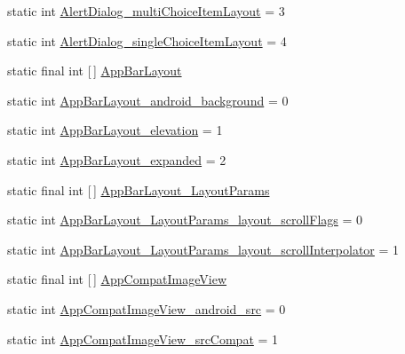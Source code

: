 \begin{DoxyCompactItemize}
\item 
static int \hyperlink{classandroid_1_1support_1_1v7_1_1appcompat_1_1R_1_1styleable_a9f6edad79aa5567ca37facbfef7f3599}{Alert\+Dialog\+\_\+multi\+Choice\+Item\+Layout} = 3
\item 
static int \hyperlink{classandroid_1_1support_1_1v7_1_1appcompat_1_1R_1_1styleable_a00877e79ce4b825ec73c301c09717556}{Alert\+Dialog\+\_\+single\+Choice\+Item\+Layout} = 4
\item 
static final int \mbox{[}$\,$\mbox{]} \hyperlink{classandroid_1_1support_1_1v7_1_1appcompat_1_1R_1_1styleable_a4a6b654a45dba60e2dbee9ce169563e2}{App\+Bar\+Layout}
\item 
static int \hyperlink{classandroid_1_1support_1_1v7_1_1appcompat_1_1R_1_1styleable_af0d3c21a0f872bb045adc8127c8f759a}{App\+Bar\+Layout\+\_\+android\+\_\+background} = 0
\item 
static int \hyperlink{classandroid_1_1support_1_1v7_1_1appcompat_1_1R_1_1styleable_a49faefcaa55b3757d218b00d5575a9ef}{App\+Bar\+Layout\+\_\+elevation} = 1
\item 
static int \hyperlink{classandroid_1_1support_1_1v7_1_1appcompat_1_1R_1_1styleable_ab1802dee91330b4d0be4959f1d92c9da}{App\+Bar\+Layout\+\_\+expanded} = 2
\item 
static final int \mbox{[}$\,$\mbox{]} \hyperlink{classandroid_1_1support_1_1v7_1_1appcompat_1_1R_1_1styleable_a4a7cc1057032876bdbbf3596c54747f4}{App\+Bar\+Layout\+\_\+\+Layout\+Params}
\item 
static int \hyperlink{classandroid_1_1support_1_1v7_1_1appcompat_1_1R_1_1styleable_a9e60ed5c50f4ab57039c8d0c6faf455e}{App\+Bar\+Layout\+\_\+\+Layout\+Params\+\_\+layout\+\_\+scroll\+Flags} = 0
\item 
static int \hyperlink{classandroid_1_1support_1_1v7_1_1appcompat_1_1R_1_1styleable_a9f970a38797d2ee751b09ca5b920ecbe}{App\+Bar\+Layout\+\_\+\+Layout\+Params\+\_\+layout\+\_\+scroll\+Interpolator} = 1
\item 
static final int \mbox{[}$\,$\mbox{]} \hyperlink{classandroid_1_1support_1_1v7_1_1appcompat_1_1R_1_1styleable_a8d637497c66d3f24c82211c9ec73a3d9}{App\+Compat\+Image\+View}
\item 
static int \hyperlink{classandroid_1_1support_1_1v7_1_1appcompat_1_1R_1_1styleable_aab0b9cf835ecfb5667add5af2b560883}{App\+Compat\+Image\+View\+\_\+android\+\_\+src} = 0
\item 
static int \hyperlink{classandroid_1_1support_1_1v7_1_1appcompat_1_1R_1_1styleable_af3c899a6b3300b34fe73e036212d9a16}{App\+Compat\+Image\+View\+\_\+src\+Compat} = 1

\end{DoxyCompactItemize}
